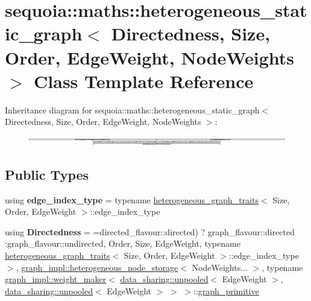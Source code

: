 \hypertarget{classsequoia_1_1maths_1_1heterogeneous__static__graph}{}\section{sequoia\+::maths\+::heterogeneous\+\_\+static\+\_\+graph$<$ Directedness, Size, Order, Edge\+Weight, Node\+Weights $>$ Class Template Reference}
\label{classsequoia_1_1maths_1_1heterogeneous__static__graph}
Inheritance diagram for sequoia\+::maths\+::heterogeneous\+\_\+static\+\_\+graph$<$ Directedness, Size, Order, Edge\+Weight, Node\+Weights $>$\+:\begin{figure}[H]
\begin{center}
\leavevmode
\includegraphics[height=0.322581cm]{classsequoia_1_1maths_1_1heterogeneous__static__graph}
\end{center}
\end{figure}
\subsection*{Public Types}
\begin{DoxyCompactItemize}
\item 
\mbox{\label{classsequoia_1_1maths_1_1heterogeneous__static__graph_af344014ec3a91fddb20ac5a1654fb5fd}} 
using {\bfseries edge\+\_\+index\+\_\+type} = typename \mbox{\hyperlink{structsequoia_1_1maths_1_1heterogeneous__graph__traits}{heterogeneous\+\_\+graph\+\_\+traits}}$<$ Size, Order, Edge\+Weight $>$\+::edge\+\_\+index\+\_\+type
\item 
\mbox{\label{classsequoia_1_1maths_1_1heterogeneous__static__graph_a23dbd69f53caf260d49df049bdf762e3}} 
using {\bfseries Directedness} = =directed\+\_\+flavour\+::directed) ? graph\+\_\+flavour\+::directed \+:graph\+\_\+flavour\+::undirected, Order, Size, Edge\+Weight, typename \mbox{\hyperlink{structsequoia_1_1maths_1_1heterogeneous__graph__traits}{heterogeneous\+\_\+graph\+\_\+traits}}$<$ Size, Order, Edge\+Weight $>$\+::edge\+\_\+index\+\_\+type $>$, \mbox{\hyperlink{classsequoia_1_1maths_1_1graph__impl_1_1heterogeneous__node__storage}{graph\+\_\+impl\+::heterogeneous\+\_\+node\+\_\+storage}}$<$ Node\+Weights... $>$, typename \mbox{\hyperlink{classsequoia_1_1maths_1_1graph__impl_1_1weight__maker}{graph\+\_\+impl\+::weight\+\_\+maker}}$<$ \mbox{\hyperlink{classsequoia_1_1data__sharing_1_1unpooled}{data\+\_\+sharing\+::unpooled}}$<$ Edge\+Weight $>$, \mbox{\hyperlink{classsequoia_1_1data__sharing_1_1unpooled}{data\+\_\+sharing\+::unpooled}}$<$ Edge\+Weight $>$ $>$ $>$\+::\mbox{\hyperlink{classsequoia_1_1maths_1_1graph__primitive}{graph\+\_\+primitive}}
\end{DoxyCompactItemize}
